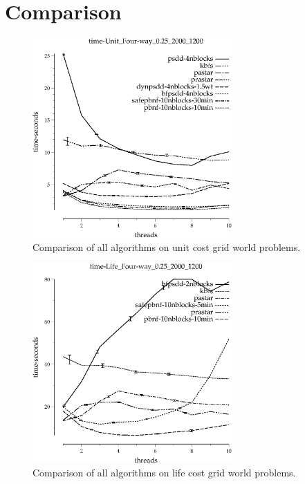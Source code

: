 \documentclass{article}
\begin{document}
\section{Comparison}
\begin{figure}[h!]
\includegraphics[width=3in]{../graphs/seth/time-Unit_Four-way_0.25_2000_1200.eps}
\caption{Comparison of all algorithms on unit cost grid world problems.}
\label{fig:comp-grid}
\end{figure}

\begin{figure}[h!]
\includegraphics[width=3in]{../graphs/seth/time-Life_Four-way_0.25_2000_1200.eps}
\caption{Comparison of all algorithms on life cost grid world problems.}
\label{fig:comp-life}
\end{figure}
\end{document}
